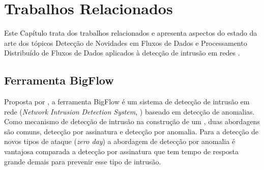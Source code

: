 \chapter{Trabalhos Relacionados}\label{cha:related}




Este Capítulo trata dos trabalhos relacionados e apresenta aspectos do estado da
arte dos tópicos Detecção de Novidades em Fluxos de Dados e Processamento
Distribuído de Fluxos de Dados aplicados à detecção de intrusão em redes \iot.

\newcommand{\kafka}{\emph{Apache Kafka}\xspace}
\newcommand{\spark}{\emph{Apache Spark}\xspace}
\newcommand{\python}{\emph{Python}\xspace}

% 
% 
% 

\section{Ferramenta BigFlow}

Proposta por , a ferramenta BigFlow é um sistema de
detecção de intrusão em rede (\emph{Network Intrusion Detection System}, \nids)
baseado em detecção de anomalias.
Como mecanismo de detecção de intrusão na construção de um \nids, duas
abordagens são comuns, detecção por assinatura e detecção por anomalia.
Para a detecção de novos tipos de ataque (\emph{zero day}) a abordagem de
detecção por anomalia é vantajosa comparada a detecção por assinatura que tem
tempo de resposta grande demais para prevenir esse tipo de intrusão.

